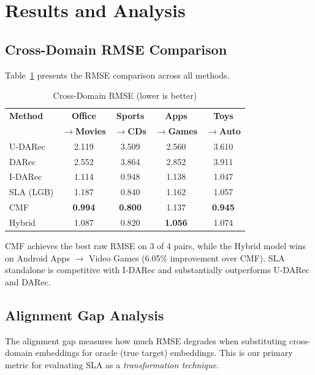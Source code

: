 \documentclass[conference]{IEEEtran}
\begin{document}
\section{Results and Analysis}

\subsection{Cross-Domain RMSE Comparison}

Table~\ref{tab:rmse} presents the RMSE comparison across all methods.

\begin{table}[h]
\centering
\caption{Cross-Domain RMSE (lower is better)}
\label{tab:rmse}
\begin{tabular}{lcccc}
\toprule
\textbf{Method} & \textbf{Office} & \textbf{Sports} & \textbf{Apps} & \textbf{Toys} \\
 & \textbf{$\to$Movies} & \textbf{$\to$CDs} & \textbf{$\to$Games} & \textbf{$\to$Auto} \\
\midrule
U-DARec & 2.119 & 3.509 & 2.560 & 3.610 \\
DARec & 2.552 & 3.864 & 2.852 & 3.911 \\
I-DARec & 1.114 & 0.948 & 1.138 & 1.047 \\
SLA (LGB) & 1.187 & 0.840 & 1.162 & 1.057 \\
CMF & \textbf{0.994} & \textbf{0.800} & 1.137 & \textbf{0.945} \\
Hybrid & 1.087 & 0.820 & \textbf{1.056} & 1.074 \\
\bottomrule
\end{tabular}
\end{table}

CMF achieves the best raw RMSE on 3 of 4 pairs, while the Hybrid model wins on Android Apps $\to$ Video Games (6.05\% improvement over CMF). SLA standalone is competitive with I-DARec and substantially outperforms U-DARec and DARec.

\subsection{Alignment Gap Analysis}

The alignment gap measures how much RMSE degrades when substituting cross-domain embeddings for oracle (true target) embeddings. This is our primary metric for evaluating SLA as a \emph{transformation technique}.
\end{document}
